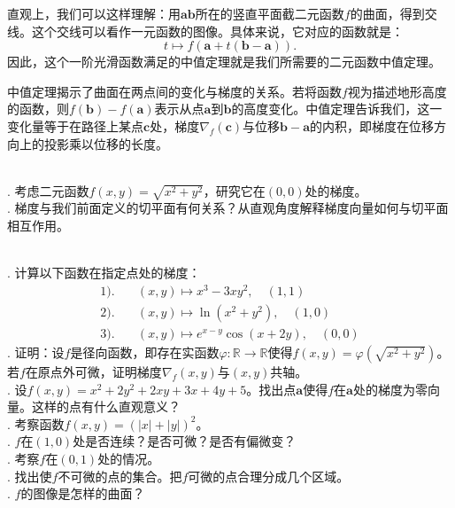 \documentclass[12pt,UTF8,fontset=none]{ctexbook}
\begin{document}
直观上，我们可以这样理解：用$\mathbf{ab}$所在的竖直平面截二元函数$f$的曲面，得到交线。这个交线可以看作一元函数的图像。具体来说，它对应的函数就是：
$$ t\mapsto f(\mathbf{a} + t(\mathbf{b} - \mathbf{a})). $$
因此，这个一阶光滑函数满足的中值定理就是我们所需要的二元函数中值定理。

中值定理揭示了曲面在两点间的变化与梯度的关系。若将函数$f$视为描述地形高度的函数，则$f(\mathbf{b})-f(\mathbf{a})$表示从点$\mathbf{a}$到$\mathbf{b}$的高度变化。中值定理告诉我们，这一变化量等于在路径上某点$\mathbf{c}$处，梯度$\nabla_f(\mathbf{c})$与位移$\mathbf{b}-\mathbf{a}$的内积，即梯度在位移方向上的投影乘以位移的长度。

\begin{sk}
\mbox{}\\
. 考虑二元函数$f(x,y) = \sqrt{x^2 + y^2}$，研究它在$(0,0)$处的梯度。\\
. 梯度与我们前面定义的切平面有何关系？从直观角度解释梯度向量如何与切平面相互作用。
\end{sk}

\begin{xt}
\mbox{}\\
. 计算以下函数在指定点处的梯度：
\begin{align*}
1).& \quad (x,y) \mapsto x^3 - 3xy^2, \quad (1,1) \\
2).& \quad (x,y) \mapsto \ln(x^2 + y^2), \quad (1,0) \\
3).& \quad (x,y) \mapsto e^{x-y}\cos(x+2y), \quad (0,0)
\end{align*}
. 证明：设$f$是径向函数，即存在实函数$\varphi:\mathbb{R}\rightarrow \mathbb{R}$使得$f(x,y) = \varphi(\sqrt{x^2 + y^2})$。若$f$在原点外可微，证明梯度$\nabla_f(x,y)$与$(x,y)$共轴。\\
. 设$f(x,y) = x^2 + 2y^2 + 2xy + 3x + 4y + 5$。找出点$\mathbf{a}$使得$f$在$\mathbf{a}$处的梯度为零向量。这样的点有什么直观意义？\\
. 考察函数$f(x,y) = (|x| + |y|)^2$。\\
. $f$在$(1,0)$处是否连续？是否可微？是否有偏微变？\\
. 考察$f$在$(0,1)$处的情况。\\
. 找出使$f$不可微的点的集合。把$f$可微的点合理分成几个区域。\\
. $f$的图像是怎样的曲面？
\end{xt}
\end{document}
